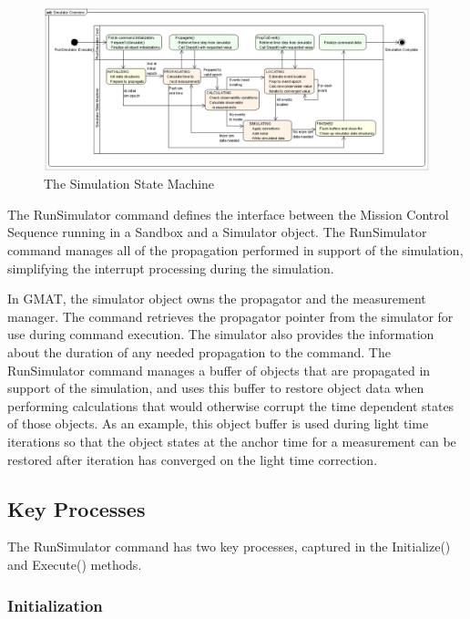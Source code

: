 \begin{figure}[htbp]
\begin{center}
\includegraphics[scale=0.38]{Images/SimulatorOverview.eps}
\caption{\label{fig:RunSimulatorStateMachine}The Simulation State Machine}
\end{center}
\end{figure}

The RunSimulator command defines the interface between the Mission Control Sequence running in a Sandbox and a Simulator object.  The RunSimulator command manages all of the propagation performed in support of the simulation, simplifying the interrupt processing during the simulation.

In GMAT, the simulator object owns the propagator and the measurement manager.  The command retrieves the propagator pointer from the simulator for use during command execution.  The simulator also provides the information about the duration of any needed propagation to the command.  The RunSimulator command manages a buffer of objects that are propagated in support of the simulation, and uses this buffer to restore object data when performing calculations that would otherwise corrupt the time dependent states of those objects.  As an example, this object buffer is used during light time iterations so that the object states at the anchor time for a measurement can be restored after iteration has converged on the light time correction.

\subsection{Key Processes}

The RunSimulator command has two key processes, captured in the Initialize() and Execute() methods.

\subsubsection{Initialization}


